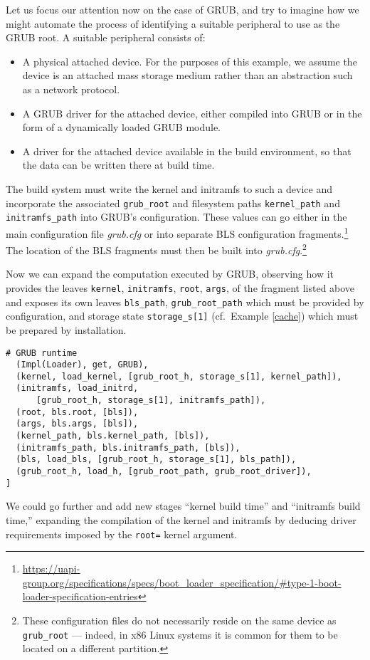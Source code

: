 Let us focus our attention now on the case of GRUB, and try to imagine how we might automate the process of identifying a suitable peripheral to use as the GRUB root.
%
A suitable peripheral consists of:
\begin{itemize}
  \item 
    A physical attached device.
    For the purposes of this example, we assume the device is an attached mass storage medium rather than an abstraction such as a network protocol.

  \item
    A GRUB driver for the attached device, either compiled into GRUB or in the form of a dynamically loaded GRUB module.

  \item
    A driver for the attached device available in the build environment, so that the data can be written there at build time.

\end{itemize}
%
The build system must write the kernel and initramfs to such a device and incorporate the associated \texttt{grub\_root} and filesystem paths \texttt{kernel\_path} and \texttt{initramfs\_path} into GRUB's configuration.
%
These values can go either in the main configuration file \emph{grub.cfg} or into separate BLS configuration fragments.\footnote{\url{https://uapi-group.org/specifications/specs/boot\_loader\_specification/\#type-1-boot-loader-specification-entries}}
%
The location of the BLS fragments must then be built into \emph{grub.cfg}.\footnote{These configuration files do not necessarily reside on the same device as \texttt{grub\_root} --- indeed, in x86 Linux systems it is common for them to be located on a different partition.}

Now we can expand the computation executed by GRUB, observing how it provides the leaves \texttt{kernel}, \texttt{initramfs}, \texttt{root}, \texttt{args}, of the fragment listed above and exposes its own leaves \texttt{bls\_path}, \texttt{grub\_root\_path} which must be provided by configuration, and storage state \texttt{storage\_s[1]} (cf.~Example \ref{cache}) which must be prepared by installation.
%
\begin{lstlisting}[name=grub]
  # GRUB runtime
  (Impl(Loader), get, GRUB),
  (kernel, load_kernel, [grub_root_h, storage_s[1], kernel_path]),
  (initramfs, load_initrd, 
      [grub_root_h, storage_s[1], initramfs_path]),
  (root, bls.root, [bls]),
  (args, bls.args, [bls]),
  (kernel_path, bls.kernel_path, [bls]),
  (initramfs_path, bls.initramfs_path, [bls]),
  (bls, load_bls, [grub_root_h, storage_s[1], bls_path]),
  (grub_root_h, load_h, [grub_root_path, grub_root_driver]),
]
\end{lstlisting}
%
We could go further and add new stages ``kernel build time'' and ``initramfs build time,'' expanding the compilation of the kernel and initramfs by deducing driver requirements imposed by the \texttt{root=} kernel argument.


